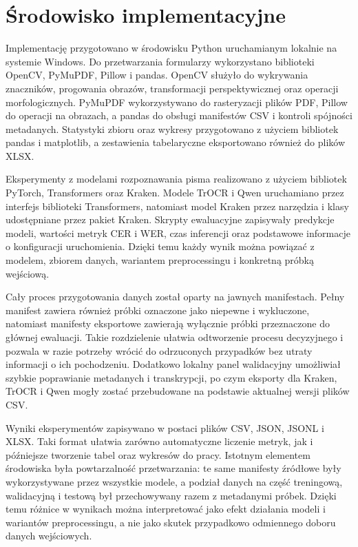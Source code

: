 \section{Środowisko implementacyjne}
\label{sec:srodowisko-implementacyjne}

Implementację przygotowano w środowisku Python uruchamianym lokalnie na systemie Windows.
Do przetwarzania formularzy wykorzystano biblioteki OpenCV, PyMuPDF, Pillow i pandas. OpenCV
służyło do wykrywania znaczników, progowania obrazów, transformacji perspektywicznej oraz operacji
morfologicznych. PyMuPDF wykorzystywano do rasteryzacji plików PDF, Pillow do operacji na obrazach,
a pandas do obsługi manifestów CSV i kontroli spójności metadanych. Statystyki zbioru oraz wykresy
przygotowano z użyciem bibliotek pandas i matplotlib, a zestawienia tabelaryczne eksportowano
również do plików XLSX.

Eksperymenty z modelami rozpoznawania pisma realizowano z użyciem bibliotek PyTorch,
Transformers oraz Kraken. Modele TrOCR i Qwen uruchamiano przez interfejs biblioteki
Transformers, natomiast model Kraken przez narzędzia i klasy udostępniane przez pakiet Kraken.
Skrypty ewaluacyjne zapisywały predykcje modeli, wartości metryk CER i WER, czas inferencji oraz
podstawowe informacje o konfiguracji uruchomienia. Dzięki temu każdy wynik można powiązać
z modelem, zbiorem danych, wariantem preprocessingu i konkretną próbką wejściową.

Cały proces przygotowania danych został oparty na jawnych manifestach. Pełny manifest zawiera
również próbki oznaczone jako niepewne i wykluczone, natomiast manifesty eksportowe zawierają
wyłącznie próbki przeznaczone do głównej ewaluacji. Takie rozdzielenie ułatwia odtworzenie procesu
decyzyjnego i pozwala w razie potrzeby wrócić do odrzuconych przypadków bez utraty informacji
o ich pochodzeniu. Dodatkowo lokalny panel walidacyjny umożliwiał szybkie poprawianie metadanych
i transkrypcji, po czym eksporty dla Kraken, TrOCR i Qwen mogły zostać przebudowane na podstawie
aktualnej wersji plików CSV.

Wyniki eksperymentów zapisywano w postaci plików CSV, JSON, JSONL i XLSX. Taki format ułatwia
zarówno automatyczne liczenie metryk, jak i późniejsze tworzenie tabel oraz wykresów do pracy.
Istotnym elementem środowiska była powtarzalność przetwarzania: te same manifesty źródłowe były
wykorzystywane przez wszystkie modele, a podział danych na część treningową, walidacyjną i testową
był przechowywany razem z metadanymi próbek. Dzięki temu różnice w wynikach można interpretować
jako efekt działania modeli i wariantów preprocessingu, a nie jako skutek przypadkowo odmiennego
doboru danych wejściowych.

